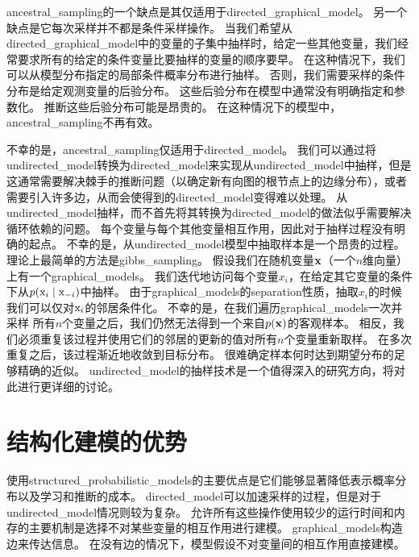 \gls{ancestral_sampling}的一个缺点是其仅适用于\gls{directed_graphical_model}。 
另一个缺点是它每次采样并不都是条件采样操作。
当我们希望从\gls{directed_graphical_model}中的变量的子集中抽样时，给定一些其他变量，我们经常要求所有的给定的条件变量比要抽样的变量的顺序要早。
在这种情况下，我们可以从模型分布指定的局部条件概率分布进行抽样。 
否则，我们需要采样的条件分布是给定观测变量的后验分布。
这些后验分布在模型中通常没有明确指定和参数化。 
推断这些后验分布可能是昂贵的。 
在这种情况下的模型中，\gls{ancestral_sampling}不再有效。



不幸的是，\gls{ancestral_sampling}仅适用于\gls{directed_model}。 
我们可以通过将\gls{undirected_model}转换为\gls{directed_model}来实现从\gls{undirected_model}中抽样，但是这通常需要解决棘手的推断问题（以确定新有向图的根节点上的边缘分布），或者需要引入许多边，从而会使得到的\gls{directed_model}变得难以处理。
从\gls{undirected_model}抽样，而不首先将其转换为\gls{directed_model}的做法似乎需要解决循环依赖的问题。 
每个变量与每个其他变量相互作用，因此对于抽样过程没有明确的起点。
不幸的是，从\gls{undirected_model}模型中抽取样本是一个昂贵的过程。
理论上最简单的方法是\gls{gibbs_sampling}。
假设我们在随机变量$\mathbf{x}$（一个$n$维向量）上有一个\gls{graphical_models}。 
我们迭代地访问每个变量$x_i$，在给定其它变量的条件下从$p(\mathrm{x}_i \mid \mathrm{x}_{-i})$中抽样。
由于\gls{graphical_models}的\gls{separation}性质，抽取$x_i$的时候我们可以仅对$\mathrm{x}_i$的邻居条件化。
不幸的是，在我们遍历\gls{graphical_models}一次并采样 所有$n$个变量之后，我们仍然无法得到一个来自$p(\mathbf{x})$的客观样本。
相反，我们必须重复该过程并使用它们的邻居的更新的值对所有$n$个变量重新取样。
在多次重复之后，该过程渐近地收敛到目标分布。
很难确定样本何时达到期望分布的足够精确的近似。
\gls{undirected_model}的抽样技术是一个值得深入的研究方向，将对此进行更详细的讨论。




\section{结构化建模的优势}
\label{sec:advantages_of_structured_modelling}


使用\gls{structured_probabilistic_models}的主要优点是它们能够显著降低表示概率分布以及学习和推断的成本。
\gls{directed_model}可以加速采样的过程，但是对于\gls{undirected_model}情况则较为复杂。
允许所有这些操作使用较少的运行时间和内存的主要机制是选择不对某些变量的相互作用进行建模。
\gls{graphical_models}构造边来传达信息。
在没有边的情况下，模型假设不对变量间的相互作用直接建模。


